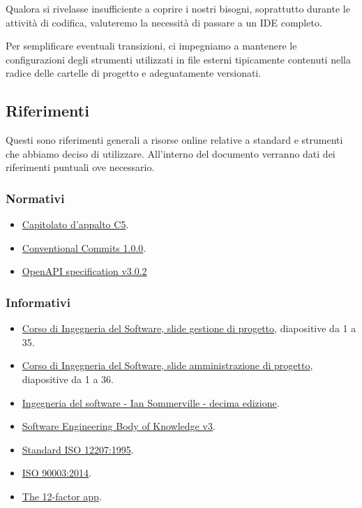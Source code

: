 \documentclass[../norme-di-progetto.tex]{subfiles}
\begin{document}
Qualora si rivelasse insufficiente a coprire i nostri bisogni, soprattutto durante le attività di codifica, valuteremo la necessità di passare a un IDE completo.

Per semplificare eventuali transizioni, ci impegniamo a mantenere le configurazioni degli strumenti utilizzati in file esterni tipicamente contenuti nella radice delle cartelle di progetto e adeguatamente versionati.

\subsection{Riferimenti}%
\label{sub:riferimenti}

Questi sono riferimenti generali a risorse online relative a standard e strumenti che abbiamo deciso di utilizzare.
All'interno del documento verranno dati dei riferimenti puntuali ove necessario.

\subsubsection{Normativi}%
\label{subs:riferimenti/normativi}

\begin{itemize}
  \item \href{https://www.math.unipd.it/~tullio/IS-1/2019/Progetto/C5.pdf}{Capitolato d'appalto C5}.
  \item \href{https://www.conventionalcommits.org/en/v1.0.0/}{Conventional Commits 1.0.0}.
  \item \href{https://spec.openapis.org/oas/v3.0.2}{OpenAPI specification v3.0.2}
\end{itemize}

\subsubsection{Informativi}%
\label{subs:riferimenti/informativi}

\begin{itemize}
  \item \href{https://www.math.unipd.it/~tullio/IS-1/2019/Dispense/L06.pdf}{Corso di Ingegneria del Software, slide gestione di progetto}, diapositive da 1 a 35.
  \item \href{https://www.math.unipd.it/~tullio/IS-1/2019/Dispense/FC01.pdf}{Corso di Ingegneria del Software, slide amministrazione di progetto}, diapositive da 1 a 36.
  \item \href{https://www.pearson.it/opera/pearson/0-6424-ingegneria_del_software}{Ingegneria del software - Ian Sommerville - decima edizione}.
  \item \href{https://www.computer.org/education/bodies-of-knowledge/software-engineering/v3}{Software Engineering Body of Knowledge v3}.
  \item \href{https://www.math.unipd.it/~tullio/IS-1/2009/Approfondimenti/ISO_12207-1995.pdf}{Standard ISO 12207:1995}.
  \item \href{https://www.iso.org/standard/66240.html}{ISO 90003:2014}.
  \item \href{https://12factor.net/}{The 12-factor app}.
\end{itemize}
\end{document}
